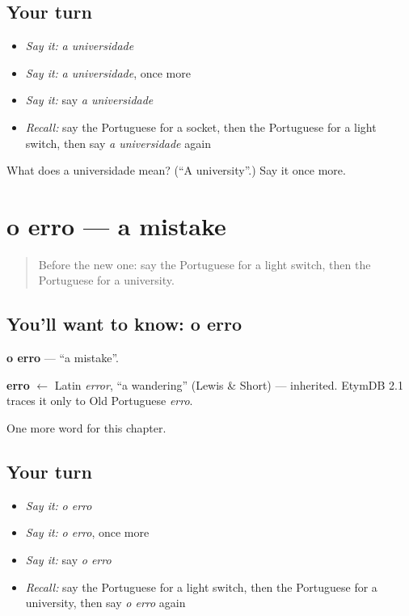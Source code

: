 \subsection*{Your turn}
\begin{itemize}
\raggedright
  \item \emph{Say it:} \emph{a universidade}
  \item \emph{Say it:} \emph{a universidade}, once more
  \item \emph{Say it:} say \emph{a universidade}
  \item \emph{Recall:} say the Portuguese for a socket, then the Portuguese for a light switch, then say \emph{a universidade} again
\end{itemize}

\begin{tcolorbox}[breakable,colback=teal!4,colframe=teal!35!black,title={Before you move on}]
What does a universidade mean? (\textquotedblleft{}A university\textquotedblright{}.) Say it once more.
\end{tcolorbox}
\section[o erro]{o erro — a mistake}

\label{lesson:PT-C230-erro}



\begin{quote}
Before the new one: say the Portuguese for a light switch, then the Portuguese for a university.
\end{quote}

\subsection*{You'll want to know: o erro}
\textbf{o erro} — \textquotedblleft{}a mistake\textquotedblright{}.

\begin{cousinweb}
\textbf{erro} $\leftarrow$ Latin \emph{error}, \textquotedblleft{}a wandering\textquotedblright{} (Lewis \& Short) — inherited. EtymDB 2.1 traces it only to Old Portuguese \emph{erro}.
\end{cousinweb}

\begin{grammarlens}[title={What you've built}]
One more word for this chapter.
\end{grammarlens}

\subsection*{Your turn}
\begin{itemize}
\raggedright
  \item \emph{Say it:} \emph{o erro}
  \item \emph{Say it:} \emph{o erro}, once more
  \item \emph{Say it:} say \emph{o erro}
  \item \emph{Recall:} say the Portuguese for a light switch, then the Portuguese for a university, then say \emph{o erro} again
\end{itemize}

